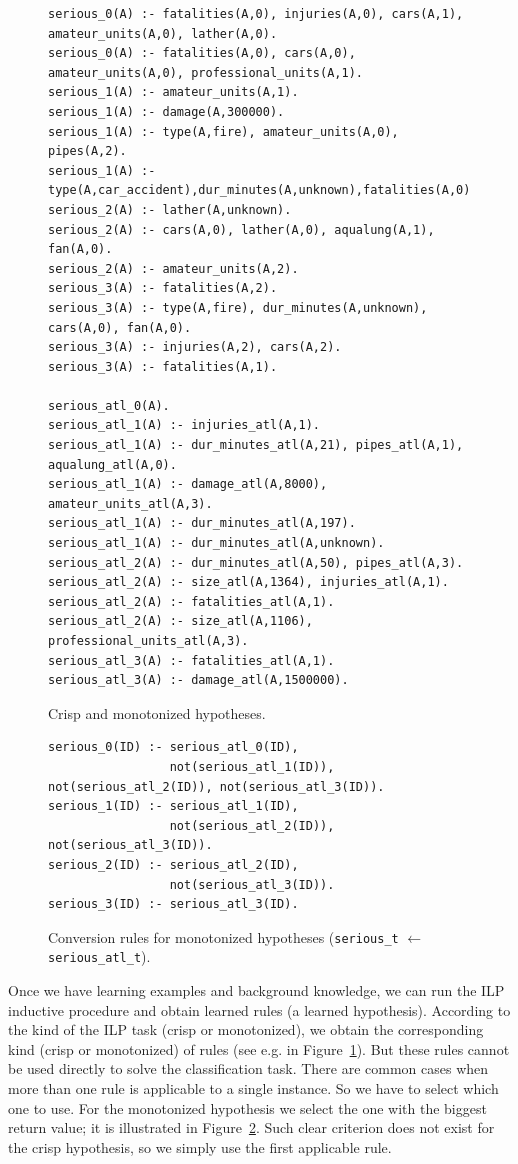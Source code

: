 \begin{figure}
\begin{verbatim}
serious_0(A) :- fatalities(A,0), injuries(A,0), cars(A,1), amateur_units(A,0), lather(A,0).
serious_0(A) :- fatalities(A,0), cars(A,0), amateur_units(A,0), professional_units(A,1).
serious_1(A) :- amateur_units(A,1).
serious_1(A) :- damage(A,300000).
serious_1(A) :- type(A,fire), amateur_units(A,0), pipes(A,2).
serious_1(A) :- type(A,car_accident),dur_minutes(A,unknown),fatalities(A,0),injuries(A,1).
serious_2(A) :- lather(A,unknown).
serious_2(A) :- cars(A,0), lather(A,0), aqualung(A,1), fan(A,0).
serious_2(A) :- amateur_units(A,2).
serious_3(A) :- fatalities(A,2).
serious_3(A) :- type(A,fire), dur_minutes(A,unknown), cars(A,0), fan(A,0).
serious_3(A) :- injuries(A,2), cars(A,2).
serious_3(A) :- fatalities(A,1).

serious_atl_0(A).
serious_atl_1(A) :- injuries_atl(A,1).
serious_atl_1(A) :- dur_minutes_atl(A,21), pipes_atl(A,1), aqualung_atl(A,0).
serious_atl_1(A) :- damage_atl(A,8000), amateur_units_atl(A,3).
serious_atl_1(A) :- dur_minutes_atl(A,197).
serious_atl_1(A) :- dur_minutes_atl(A,unknown).
serious_atl_2(A) :- dur_minutes_atl(A,50), pipes_atl(A,3).
serious_atl_2(A) :- size_atl(A,1364), injuries_atl(A,1).
serious_atl_2(A) :- fatalities_atl(A,1).
serious_atl_2(A) :- size_atl(A,1106), professional_units_atl(A,3).
serious_atl_3(A) :- fatalities_atl(A,1).
serious_atl_3(A) :- damage_atl(A,1500000).
\end{verbatim}
\caption{Crisp and monotonized hypotheses.}
\label{img:rules}
\end{figure}


\begin{figure}	
\begin{verbatim}
serious_0(ID) :- serious_atl_0(ID),
                 not(serious_atl_1(ID)), not(serious_atl_2(ID)), not(serious_atl_3(ID)).
serious_1(ID) :- serious_atl_1(ID),
                 not(serious_atl_2(ID)), not(serious_atl_3(ID)).
serious_2(ID) :- serious_atl_2(ID),
                 not(serious_atl_3(ID)).
serious_3(ID) :- serious_atl_3(ID).
\end{verbatim}						
\caption{Conversion rules for monotonized hypotheses (\texttt{serious\_t} $\leftarrow$ \texttt{serious\_atl\_t}).}
\label{img:conversion}
\end{figure}



Once we have learning examples and background knowledge, we can run the ILP inductive procedure and obtain learned rules (a learned hypothesis). According to the kind of the ILP task (crisp or monotonized), we obtain the corresponding kind (crisp or monotonized) of rules (see e.g. in Figure~\ref{img:rules}). But these rules cannot be used directly to solve the classification task. There are common cases when more than one rule is applicable to a single instance. So we have to select which one to use. For the monotonized hypothesis we select the one with the biggest return value; it is illustrated in Figure~\ref{img:conversion}. Such clear criterion does not exist for the crisp hypothesis, so we simply use the first applicable rule.


